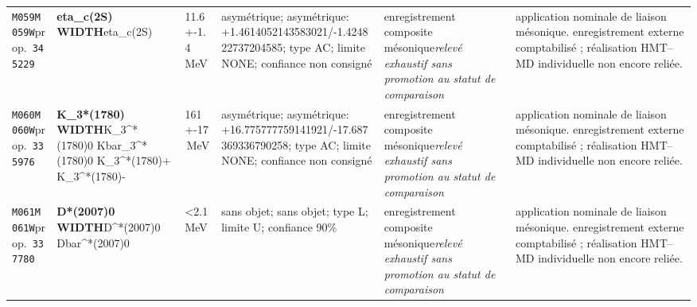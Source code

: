 \begin{landscape}
\begin{longtable}{L{1.85cm}L{4.45cm}L{2.35cm}L{4.05cm}L{3.35cm}L{7.15cm}}
\texttt{M059}\newline \texttt{M059W}\newline prop.\ \texttt{345229} & \textbf{eta\_\allowbreak{}c(2S) WIDTH}\newline eta\_\allowbreak{}c(2S) & 11.6+-1.4\,MeV & asymétrique; asymétrique: +1.4614052143583021/-1.424822737204585; type AC; limite NONE; confiance non consigné & enregistrement composite mésonique\newline \emph{relevé exhaustif sans promotion au statut de comparaison} & application nominale de liaison mésonique. enregistrement externe comptabilisé ; réalisation HMT--MD individuelle non encore reliée. \\
\texttt{M060}\newline \texttt{M060W}\newline prop.\ \texttt{335976} & \textbf{K\_\allowbreak{}3*(1780) WIDTH}\newline K\_\allowbreak{}3\textasciicircum{}*(1780)0 \textbar{}\allowbreak{} Kbar\_\allowbreak{}3\textasciicircum{}*(1780)0 \textbar{}\allowbreak{} K\_\allowbreak{}3\textasciicircum{}*(1780)+ \textbar{}\allowbreak{} K\_\allowbreak{}3\textasciicircum{}*(1780)- & 161+-17\,MeV & asymétrique; asymétrique: +16.775777759141921/-17.687369336790258; type AC; limite NONE; confiance non consigné & enregistrement composite mésonique\newline \emph{relevé exhaustif sans promotion au statut de comparaison} & application nominale de liaison mésonique. enregistrement externe comptabilisé ; réalisation HMT--MD individuelle non encore reliée. \\
\texttt{M061}\newline \texttt{M061W}\newline prop.\ \texttt{337780} & \textbf{D*(2007)0 WIDTH}\newline D\textasciicircum{}*(2007)0 \textbar{}\allowbreak{} Dbar\textasciicircum{}*(2007)0 & \textless{}2.1\,MeV & sans objet; sans objet; type L; limite U; confiance 90\% & enregistrement composite mésonique\newline \emph{relevé exhaustif sans promotion au statut de comparaison} & application nominale de liaison mésonique. enregistrement externe comptabilisé ; réalisation HMT--MD individuelle non encore reliée. \\

\end{longtable}
\end{landscape}
